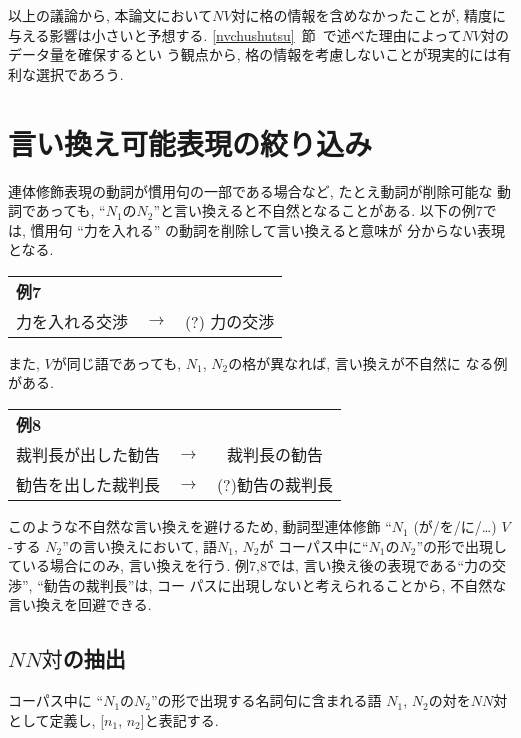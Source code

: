 以上の議論から, 本論文において$NV対$に格の情報を含めなかったことが,
精度に与える影響は小さいと予想する.
\ref{nvchushutsu}~節~で述べた理由によって$NV対$のデータ量を確保するとい
う観点から, 格の情報を考慮しないことが現実的には有利な選択であろう.

\section{言い換え可能表現の絞り込み}{\label{NNpair}}
連体修飾表現の動詞が慣用句の一部である場合など,  たとえ動詞が削除可能な
動詞であっても, ``$N_1のN_2$''と言い換えると不自然となることがある. 
以下の例7では, 慣用句 ``力を入れる'' の動詞を削除して言い換えると意味が
分からない表現となる.
\begin{center}
 \begin{tabular}{lcc}
  {\bf 例7} & & \\
  力を入れる交渉 & $\to$ & (?) 力の交渉\\
 \end{tabular}
\end{center}
また, $V$が同じ語であっても, $N_1$, $N_2$の格が異なれば, 言い換えが不自然に
なる例がある.
\begin{center}
\begin{tabular}{lcc}
 {\bf 例8} & & \\
 裁判長が出した勧告 & $\to$ & 裁判長の勧告\\
 勧告を出した裁判長 & $\to$ & (?)勧告の裁判長\\
\end{tabular}
\end{center}

このような不自然な言い換えを避けるため, 動詞型連体修飾
``$N_1$ (が/を/に/…) $V$-する $N_2$''の言い換えにおいて, 語$N_1$, $N_2$が
コーパス中に``$N_1のN_2$''の形で出現している場合にのみ, 言い換えを行う.
例7,8では, 言い換え後の表現である``力の交渉'', ``勧告の裁判長''は, コー
パスに出現しないと考えられることから, 不自然な言い換えを回避できる.

\subsection{$NN対$の抽出}
コーパス中に ``$N_1のN_2$''の形で出現する名詞句に含まれる語
$N_1$, $N_2$の対を$NN対$として定義し, [$n_1$, $n_2$]と表記する.

